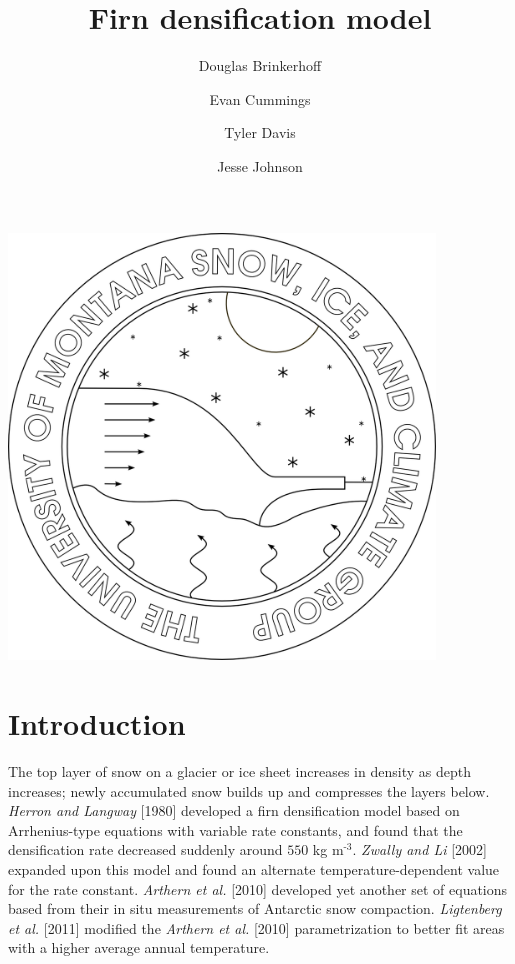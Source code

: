 \documentclass{article}%
\newcommand{\sups}[1]{\ensuremath{^{\textrm{#1}}}}
\begin{document}

\title{Firn densification model}
\author{Douglas Brinkerhoff \and Evan Cummings \and Tyler Davis \and Jesse Johnson}
\maketitle
\begin{center}
\includegraphics[width=4.455666122085252in]{images/logoPlain.png}
\end{center}

\twocolumn


\section{Introduction}

The top layer of snow on a glacier or ice sheet increases in density as depth increases; newly accumulated snow builds up and compresses the layers below.  \emph{Herron and Langway} [1980] developed a firn densification model based on Arrhenius-type equations with variable rate constants, and found that the densification rate decreased suddenly around $550$ kg m\sups{-3}.  \emph{Zwally and Li} [2002] expanded upon this model and found an alternate temperature-dependent value for the rate constant.  \emph{Arthern et al.} [2010] developed yet another set of equations based from their in situ measurements of Antarctic snow compaction.  \emph{Ligtenberg et al.} [2011] modified the \emph{Arthern et al.} [2010] parametrization to better fit areas with a higher average annual temperature. 
\end{document}
